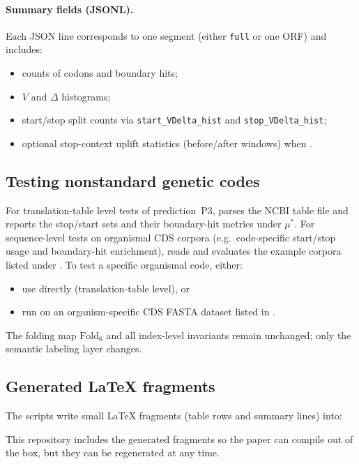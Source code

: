 \paragraph{Summary fields (JSONL).}
Each JSON line corresponds to one segment (either \texttt{full} or one ORF) and includes:
\begin{itemize}
\item counts of codons and boundary hits;
\item $V$ and $\Delta$ histograms;
\item start/stop split counts via \texttt{start\_VDelta\_hist} and \texttt{stop\_VDelta\_hist};
\item optional stop-context uplift statistics (before/after windows) when .
\end{itemize}

\subsection{Testing nonstandard genetic codes}
For translation-table level tests of prediction~P3,  parses the NCBI table file  and reports the stop/start sets and their boundary-hit metrics under $\mu^\ast$.
For sequence-level tests on organismal CDS corpora (e.g.\ code-specific start/stop usage and boundary-hit enrichment),  reads  and evaluates the example corpora listed under .
To test a specific organismal code, either:
\begin{itemize}
\item use  directly (translation-table level), or
\item run  on an organism-specific CDS FASTA dataset listed in .
\end{itemize}
The folding map $\mathrm{Fold}_6$ and all index-level invariants remain unchanged; only the semantic labeling layer changes.

\subsection{Generated LaTeX fragments}
The scripts write small LaTeX fragments (table rows and summary lines) into:
\begin{center}
\end{center}
This repository includes the generated fragments so the paper can compile out of the box, but they can be regenerated at any time.

